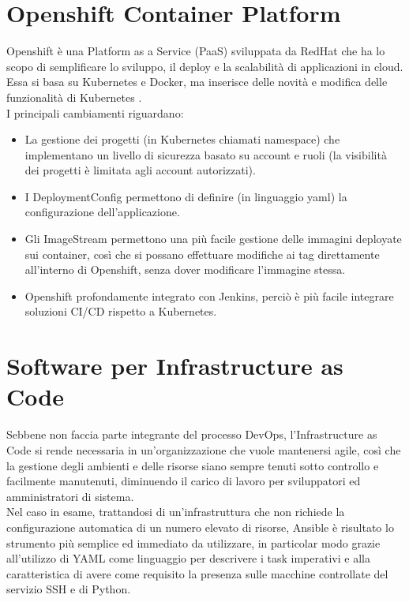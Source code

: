 \documentclass[a4paper, 12pt]{report}
\numberwithin{equation}{section}
\begin{document}
\section{Openshift Container Platform}
Openshift è una Platform as a Service (PaaS) sviluppata da RedHat che ha lo scopo di semplificare lo sviluppo, il deploy e la scalabilità di applicazioni in cloud. Essa si basa su Kubernetes e Docker, ma inserisce delle novità e modifica delle funzionalità di Kubernetes \cite{kubernetes-vs-openshift}.\\
I principali cambiamenti riguardano:
\begin{itemize}
    \item La gestione dei progetti (in Kubernetes chiamati namespace) che implementano un livello di sicurezza basato su account e ruoli (la visibilità dei progetti è limitata agli account autorizzati).
    \item I DeploymentConfig permettono di definire (in linguaggio yaml) la configurazione dell’applicazione.
    \item Gli ImageStream permettono una più facile gestione delle immagini deployate sui container, così che si possano effettuare modifiche ai tag direttamente all’interno di Openshift, senza dover modificare l’immagine stessa.
    \item Openshift profondamente integrato con Jenkins, perciò è più facile integrare soluzioni CI/CD rispetto a Kubernetes.
\end{itemize}

\section{Software per Infrastructure as Code}
Sebbene non faccia parte integrante del processo DevOps, l’Infrastructure as Code si rende necessaria in un’organizzazione che vuole mantenersi agile, così che la gestione degli ambienti e delle risorse siano sempre tenuti sotto controllo e facilmente manutenuti, diminuendo il carico di lavoro per sviluppatori ed amministratori di sistema.\\
Nel caso in esame, trattandosi di un’infrastruttura che non richiede la configurazione automatica di un numero elevato di risorse, Ansible è risultato lo strumento più semplice ed immediato da utilizzare, in particolar modo grazie all’utilizzo di YAML come linguaggio per descrivere i task imperativi e alla caratteristica di avere come requisito la presenza sulle macchine controllate del servizio SSH e di Python.
\end{document}
